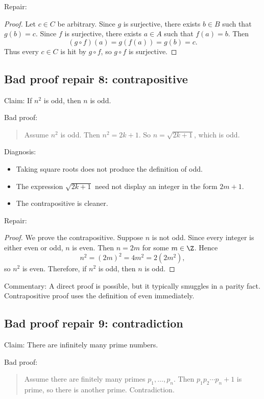 Repair:

\begin{proof}
Let $c\in C$ be arbitrary. Since $g$ is surjective, there exists $b\in B$ such that $g(b)=c$. Since $f$ is surjective, there exists $a\in A$ such that $f(a)=b$. Then
\[
(g\circ f)(a)=g(f(a))=g(b)=c.
\]
Thus every $c\in C$ is hit by $g\circ f$, so $g\circ f$ is surjective.
\end{proof}

\subsection{Bad proof repair 8: contrapositive}

Claim: If $n^2$ is odd, then $n$ is odd.

Bad proof:

\begin{quote}
Assume $n^2$ is odd. Then $n^2=2k+1$. So $n=\sqrt{2k+1}$, which is odd.
\end{quote}

Diagnosis:

\begin{itemize}
\item Taking square roots does not produce the definition of odd.
\item The expression $\sqrt{2k+1}$ need not display an integer in the form $2m+1$.
\item The contrapositive is cleaner.
\end{itemize}

Repair:

\begin{proof}
We prove the contrapositive. Suppose $n$ is not odd. Since every integer is either even or odd, $n$ is even. Then $n=2m$ for some $m\in\Z$. Hence
\[
n^2=(2m)^2=4m^2=2(2m^2),
\]
so $n^2$ is even. Therefore, if $n^2$ is odd, then $n$ is odd.
\end{proof}

Commentary: A direct proof is possible, but it typically smuggles in a parity fact. Contrapositive proof uses the definition of even immediately.

\subsection{Bad proof repair 9: contradiction}

Claim: There are infinitely many prime numbers.

Bad proof:

\begin{quote}
Assume there are finitely many primes $p_1,\ldots,p_n$. Then $p_1p_2\cdots p_n+1$ is prime, so there is another prime. Contradiction.
\end{quote}

